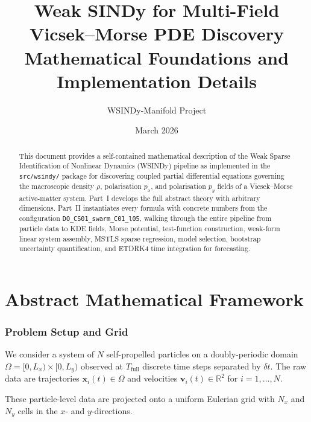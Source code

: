 \documentclass[11pt, letterpaper]{article}
\title{%
  \textbf{Weak SINDy for Multi-Field Vicsek--Morse PDE Discovery}\\[6pt]
  \large Mathematical Foundations and Implementation Details}
\author{WSINDy-Manifold Project}
\date{March 2026}
\theoremstyle{definition}
\newcommand{\R}{\mathbb{R}}
\newcommand{\vx}{\mathbf{x}}
\newcommand{\vv}{\mathbf{v}}
\begin{document}
\maketitle

\begin{abstract}
This document provides a self-contained mathematical description of the
Weak Sparse Identification of Nonlinear Dynamics (WSINDy) pipeline as
implemented in the \texttt{src/wsindy/} package for discovering
coupled partial differential equations governing the macroscopic
density $\rho$, polarisation $p_x$, and polarisation $p_y$ fields of
a Vicsek--Morse active-matter system.  Part~I develops the full
abstract theory with arbitrary dimensions.  Part~II instantiates every
formula with concrete numbers from the configuration
\texttt{DO\_CS01\_swarm\_C01\_l05}, walking through the entire pipeline
from particle data to KDE fields, Morse potential, test-function
construction, weak-form linear system assembly, MSTLS sparse
regression, model selection, bootstrap uncertainty quantification,
and ETDRK4 time integration for forecasting.
\end{abstract}

\tableofcontents
\newpage


\part{Abstract Mathematical Framework}
\label{part:abstract}

\section{Problem Setup and Grid}
\label{sec:setup}

We consider a system of $N$ self-propelled particles on a doubly-periodic
domain $\Omega = [0, L_x) \times [0, L_y)$ observed at $T_{\mathrm{full}}$
discrete time steps separated by $\delta t$.  The raw data are
trajectories $\vx_i(t) \in \Omega$ and velocities
$\vv_i(t) \in \R^{2}$ for $i = 1, \dots, N$.

These particle-level data are projected onto a uniform Eulerian grid
with $N_x$ and $N_y$ cells in the $x$- and $y$-directions.
\end{document}
